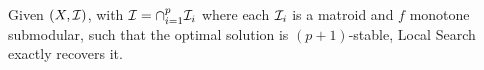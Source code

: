 \begin{theorem}\label{th:LSmatroids}
Given $(X,\mathcal{I})$, with $\mathcal{I}=\cap_{i=1}^p \mathcal{I}_i$ where each $\mathcal{I}_i$ is a matroid and $f$ monotone submodular, such that the optimal solution is $(p+1)$-stable, Local Search exactly recovers it.
\end{theorem}











